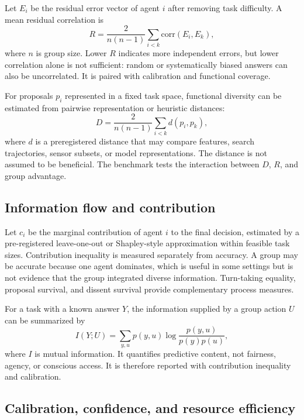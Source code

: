 \documentclass[conference]{IEEEtran}
\begin{document}
Let $E_i$ be the residual error vector of agent $i$ after removing task difficulty. A mean residual correlation is
\begin{equation}
R=\frac{2}{n(n-1)}\sum_{i<k}\mathrm{corr}(E_i,E_k),
\label{eq:errorcorrelation}
\end{equation}
where $n$ is group size. Lower $R$ indicates more independent errors, but lower correlation alone is not sufficient: random or systematically biased answers can also be uncorrelated. It is paired with calibration and functional coverage.

For proposals $p_i$ represented in a fixed task space, functional diversity can be estimated from pairwise representation or heuristic distances:
\begin{equation}
D=\frac{2}{n(n-1)}\sum_{i<k}d(p_i,p_k),
\label{eq:diversity}
\end{equation}
where $d$ is a preregistered distance that may compare features, search trajectories, sensor subsets, or model representations. The distance is not assumed to be beneficial. The benchmark tests the interaction between $D$, $R$, and group advantage.

\subsection{Information flow and contribution}

Let $c_i$ be the marginal contribution of agent $i$ to the final decision, estimated by a pre-registered leave-one-out or Shapley-style approximation within feasible task sizes. Contribution inequality is measured separately from accuracy. A group may be accurate because one agent dominates, which is useful in some settings but is not evidence that the group integrated diverse information. Turn-taking equality, proposal survival, and dissent survival provide complementary process measures.

For a task with a known answer $Y$, the information supplied by a group action $U$ can be summarized by
\begin{equation}
I(Y;U)=\sum_{y,u}p(y,u)\log\frac{p(y,u)}{p(y)p(u)},
\label{eq:information}
\end{equation}
where $I$ is mutual information. It quantifies predictive content, not fairness, agency, or conscious access. It is therefore reported with contribution inequality and calibration.

\subsection{Calibration, confidence, and resource efficiency}
\end{document}

